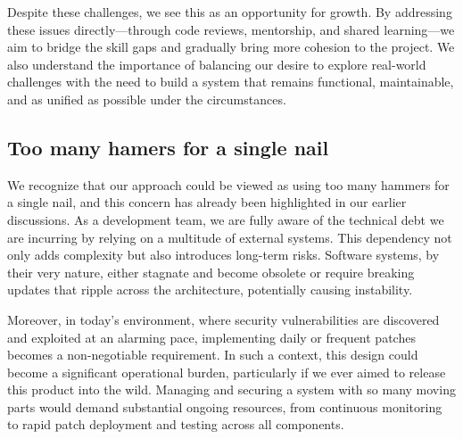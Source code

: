 Despite these challenges, we see this as an opportunity for growth. By addressing these issues directly—through code reviews, mentorship, and shared learning—we aim to bridge the skill gaps and gradually bring more cohesion to the project. We also understand the importance of balancing our desire to explore real-world challenges with the need to build a system that remains functional, maintainable, and as unified as possible under the circumstances.

\subsection{Too many hamers for a single nail}
We recognize that our approach could be viewed as using too many hammers for a single nail, and this concern has already been highlighted in our earlier discussions. As a development team, we are fully aware of the technical debt we are incurring by relying on a multitude of external systems. This dependency not only adds complexity but also introduces long-term risks. Software systems, by their very nature, either stagnate and become obsolete or require breaking updates that ripple across the architecture, potentially causing instability.

Moreover, in today’s environment, where security vulnerabilities are discovered and exploited at an alarming pace, implementing daily or frequent patches becomes a non-negotiable requirement. In such a context, this design could become a significant operational burden, particularly if we ever aimed to release this product into the wild. Managing and securing a system with so many moving parts would demand substantial ongoing resources, from continuous monitoring to rapid patch deployment and testing across all components.